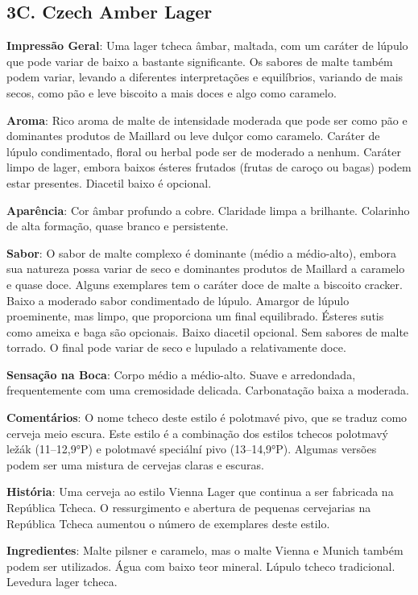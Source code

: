 \subsection*{3C. Czech Amber Lager}
\textbf{Impressão Geral}: Uma lager tcheca âmbar, maltada, com um caráter de lúpulo que pode variar de baixo a bastante significante. Os sabores de malte também podem variar, levando a diferentes interpretações e equilíbrios, variando de mais secos, como pão e leve biscoito a mais doces e algo como caramelo.

\textbf{Aroma}: Rico aroma de malte de intensidade moderada que pode ser como pão e dominantes produtos de Maillard ou leve dulçor como caramelo. Caráter de lúpulo condimentado, floral ou herbal pode ser de moderado a nenhum. Caráter limpo de lager, embora baixos ésteres frutados (frutas de caroço ou bagas) podem estar presentes. Diacetil baixo é opcional.

\textbf{Aparência}: Cor âmbar profundo a cobre. Claridade limpa a brilhante. Colarinho de alta formação, quase branco e persistente.

\textbf{Sabor}: O sabor de malte complexo é dominante (médio a médio-alto), embora sua natureza possa variar de seco e dominantes produtos de Maillard a caramelo e quase doce. Alguns exemplares tem o caráter doce de malte a biscoito cracker. Baixo a moderado sabor condimentado de lúpulo. Amargor de lúpulo proeminente, mas limpo, que proporciona um final equilibrado. Ésteres sutis como ameixa e baga são opcionais. Baixo diacetil opcional. Sem sabores de malte torrado. O final pode variar de seco e lupulado a relativamente doce.

\textbf{Sensação na Boca}: Corpo médio a médio-alto. Suave e arredondada, frequentemente com uma cremosidade delicada. Carbonatação baixa a moderada.

\textbf{Comentários}: O nome tcheco deste estilo é polotmavé pivo, que se traduz como cerveja meio escura. Este estilo é a combinação dos estilos tchecos polotmavý ležák (11–12,9°P) e polotmavé speciální pivo (13–14,9°P). Algumas versões podem ser uma mistura de cervejas claras e escuras.

\textbf{História}: Uma cerveja ao estilo Vienna Lager que continua a ser fabricada na República Tcheca. O ressurgimento e abertura de pequenas cervejarias na República Tcheca aumentou o número de exemplares deste estilo.

\textbf{Ingredientes}: Malte pilsner e caramelo, mas o malte Vienna e Munich também podem ser utilizados. Água com baixo teor mineral. Lúpulo tcheco tradicional. Levedura lager tcheca.

